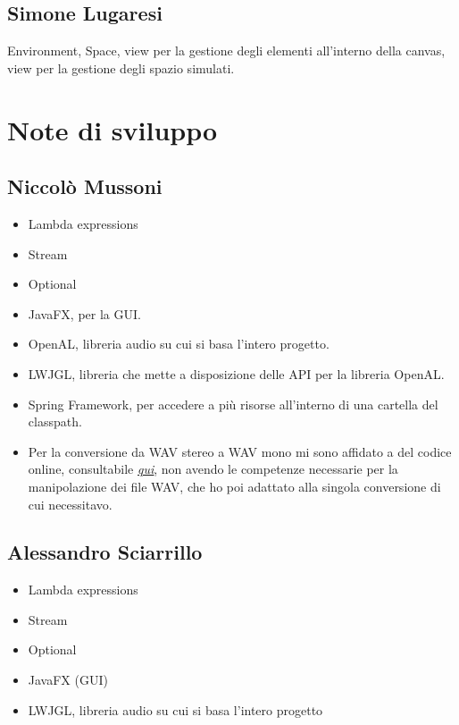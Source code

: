 \documentclass[a4paper,12pt]{report}
\begin{document}
\subsection*{Simone Lugaresi}
Environment, Space, view per la gestione degli elementi all'interno della canvas, view per la gestione degli spazio simulati.
\section{Note di sviluppo}
\subsection*{Niccolò Mussoni}
\begin{itemize}
	\item Lambda expressions
	\item Stream
	\item Optional
	\item JavaFX, per la GUI.
	\item OpenAL, libreria audio su cui si basa l’intero progetto.
	\item LWJGL, libreria che mette a disposizione delle API per la libreria OpenAL.
	\item Spring Framework, per accedere a più risorse all'interno di una cartella del classpath.
	\item Per la conversione da WAV stereo a WAV mono mi sono affidato a del codice online, consultabile \textit{\underline{\href{http://www.java2s.com/example/java/javax.sound.sampled/converts-re-samples-and-mono-tofrom-stereo-audio-data.html}{qui}}}, non avendo le competenze necessarie per la manipolazione dei file WAV, che ho poi adattato alla singola conversione di cui necessitavo.
\end{itemize}
\subsection*{Alessandro Sciarrillo}
\begin{itemize}
	\item Lambda expressions
	\item Stream
	\item Optional
	\item JavaFX (GUI)
	\item LWJGL, libreria audio su cui si basa l’intero progetto
\end{itemize}
\end{document}
